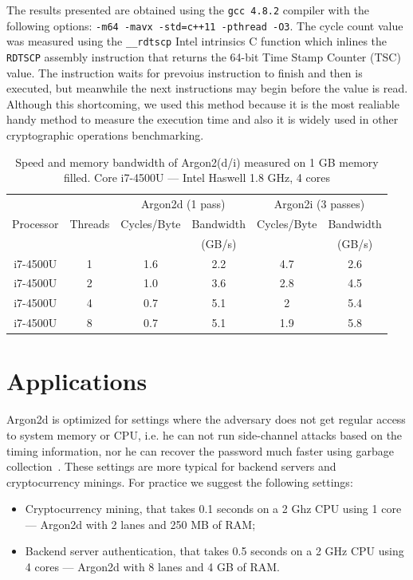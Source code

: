 \documentclass[a4paper]{article}
\begin{document}
The results presented are obtained using the \texttt{gcc 4.8.2} compiler  with the following options: \texttt{-m64 -mavx -std=c++11 -pthread -O3}.
The cycle count value was measured using the \texttt{\_\_rdtscp} Intel intrinsics C function which inlines the \texttt{RDTSCP} assembly instruction that returns the 64-bit Time Stamp Counter (TSC) value. The instruction waits for prevoius instruction to finish and then is executed, but meanwhile the next instructions may begin before the value is read. Although this shortcoming, we used this method because it is the most realiable handy method to measure the execution time and also it is widely used in other cryptographic operations benchmarking.

\begin{table}
\begin{center}
\begin{tabular}{|cc||cc|cc|}
\hline
& & \multicolumn{2}{c|}{\textsf{Argon2d} (1 pass)} & \multicolumn{2}{|c|}{\textsf{Argon2i} (3 passes)}  \\
\cline{3-6}
Processor & Threads & Cycles/Byte & Bandwidth & Cycles/Byte & Bandwidth \\
& & & (GB/s) & & (GB/s)\\
\hline
 i7-4500U & 1 &1.6 & 2.2 & 4.7 & 2.6 \\
\hline
 i7-4500U & 2 &1.0& 3.6&2.8 & 4.5\\
\hline
 i7-4500U & 4 &0.7 & 5.1 & 2 & 5.4 \\
\hline
 i7-4500U & 8 & 0.7 & 5.1 & 1.9 & 5.8\\
\hline
\end{tabular}
\end{center}
\caption{Speed and memory bandwidth of Argon2(d/i) measured on 1 GB memory filled. Core i7-4500U --- Intel Haswell 1.8 GHz, 4 cores}
\label{table:cycle_per_byte_results}
\end{table}

\section{Applications}
\textsf{Argon2d} is optimized for settings where the adversary does not get regular access to system memory or CPU, i.e. he can not run side-channel attacks based on the timing information, nor he
can recover the password much faster using garbage collection~\cite{cryptoeprint:2014:881}. These settings are more typical for backend servers and cryptocurrency minings. For practice we suggest the following settings:
\begin{itemize}
  \item Cryptocurrency mining, that takes 0.1 seconds on a 2 Ghz CPU using 1 core --- \textsf{Argon2d} with 2 lanes and 250 MB of RAM;
  \item Backend server authentication, that takes 0.5 seconds on a 2 GHz CPU using 4 cores --- \textsf{Argon2d} with 8 lanes and 4 GB of RAM.
\end{itemize}
\end{document}
